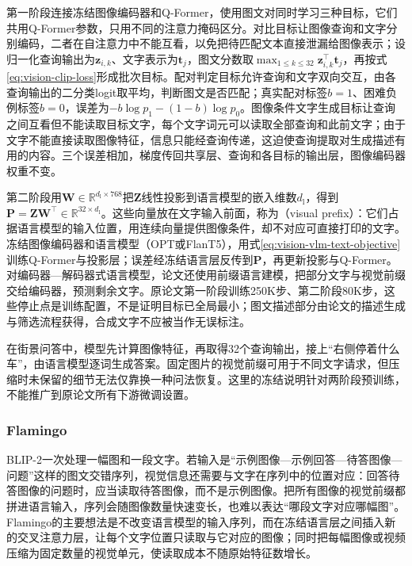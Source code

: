 第一阶段连接冻结图像编码器和Q-Former，使用图文对同时学习三种目标，它们共用Q-Former参数，只用不同的注意力掩码区分。对比目标让图像查询和文字分别编码，二者在自注意力中不能互看，以免把待匹配文本直接泄漏给图像表示；设归一化查询输出为$\bm z_{i,k}$、文字表示为$\bm t_j$，图文分数取$\max_{1\leq k\leq 32}\bm z_{i,k}^{\top}\bm t_j$，再按式\eqref{eq:vision-clip-loss}形成批次目标。配对判定目标允许查询和文字双向交互，由各查询输出的二分类logit取平均，判断图文是否匹配；真实配对标签$b=1$、困难负例标签$b=0$，误差为$-b\log p_1-(1-b)\log p_0$。图像条件文字生成目标让查询之间互看但不能读取目标文字，每个文字词元可以读取全部查询和此前文字；由于文字不能直接读取图像特征，信息只能经查询传递，这迫使查询提取对生成描述有用的内容。三个误差相加，梯度传回共享层、查询和各目标的输出层，图像编码器权重不变。

第二阶段用$\bm W\in\mathbb R^{d_{\mathrm l}\times 768}$把$\bm Z$线性投影到语言模型的嵌入维数$d_{\mathrm l}$，得到$\bm P=\bm Z\bm W^\top\in\mathbb R^{32\times d_{\mathrm l}}$。这些向量放在文字输入前面，称为（visual prefix）：它们占据语言模型的输入位置，用连续向量提供图像条件，却不对应可直接打印的文字。冻结图像编码器和语言模型（OPT或FlanT5），用式\eqref{eq:vision-vlm-text-objective}训练Q-Former与投影层；误差经冻结语言层反传到$\bm P$，再更新投影与Q-Former。对编码器—解码器式语言模型，论文还使用前缀语言建模，把部分文字与视觉前缀交给编码器，预测剩余文字。原论文第一阶段训练250K步、第二阶段80K步，这些停止点是训练配置，不是证明目标已全局最小；图文描述部分由论文的描述生成与筛选流程获得，合成文字不应被当作无误标注。

在街景问答中，模型先计算图像特征，再取得32个查询输出，接上“右侧停着什么车”，由语言模型逐词生成答案。固定图片的视觉前缀可用于不同文字请求，但压缩时未保留的细节无法仅靠换一种问法恢复。这里的冻结说明针对两阶段预训练，不能推广到原论文所有下游微调设置。

\subsubsection{Flamingo}
\label{sec:vision-models-flamingo}

BLIP-2一次处理一幅图和一段文字。若输入是“示例图像—示例回答—待答图像—问题”这样的图文交错序列，视觉信息还需要与文字在序列中的位置对应：回答待答图像的问题时，应当读取待答图像，而不是示例图像。把所有图像的视觉前缀都拼进语言输入，序列会随图像数量快速变长，也难以表达“哪段文字对应哪幅图”。Flamingo的主要想法是不改变语言模型的输入序列，而在冻结语言层之间插入新的交叉注意力层，让每个文字位置只读取与它对应的图像；同时把每幅图像或视频压缩为固定数量的视觉单元，使读取成本不随原始特征数增长。


